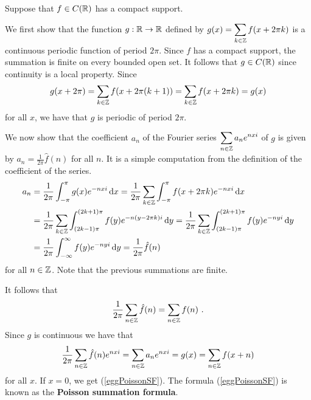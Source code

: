 \begin{egg}
Suppose that $f \in C(\mathbb{R})$ has a compact support.

We first show that the function $\displaystyle g:\mathbb{R} \to \mathbb{R}$ defined by
$\displaystyle g(x) = \sum_{k\in \mathbb{Z}} f(x+ 2 \pi k)$ is a
continuous periodic function of period $2\pi$.  Since $f$ has a
compact support, the summation is finite on every bounded open set.
It follows that $g \in C(\mathbb{R})$ since continuity is a local property.
Since
\[
g(x+2\pi) = \sum_{k\in \mathbb{Z}} f(x+2\pi(k+1))
= \sum_{k\in \mathbb{Z}} f(x+2 \pi k) = g(x)
\]
for all $x$, we have that $g$ is periodic of period $2 \pi$.

We now show that the coefficient $a_n$ of the Fourier series
$\displaystyle \sum_{n\in \mathbb{Z}} a_n e^{n x i}$ of $g$ is given by
$\displaystyle a_n = \frac{1}{2\pi} \hat{f}(n)$ for all $n$.  It is a simple
computation from the definition of the coefficient of the series.
\begin{align*}
a_n &= \frac{1}{2\pi} \int_{-\pi}^{\pi} g(x) e^{- n x i} \,\mathrm{d}{x}
= \frac{1}{2\pi}
\sum_{k\in \mathbb{Z}} \int_{-\pi}^{\pi} f(x+ 2 \pi k) e^{-n x i} \,\mathrm{d}{x} \\
&= \frac{1}{2\pi} 
\sum_{k\in \mathbb{Z}} \int_{(2k-1)\pi}^{(2k+1)\pi} f(y)
e^{-n (y-2 \pi k) i} \,\mathrm{d}{y}
= \frac{1}{2\pi} 
\sum_{k\in \mathbb{Z}} \int_{(2k-1)\pi}^{(2k+1)\pi} f(y) e^{-n y i} \,\mathrm{d}{y} \\
&= \frac{1}{2\pi} \int_{-\infty}^{\infty} f(y) e^{- n y i} \,\mathrm{d}{y}
= \frac{1}{2\pi} \hat{f}(n)
\end{align*}
for all $n \in \mathbb{Z}$.  Note that the previous summations are finite.

It follows that
\begin{equation} \label{eggPoissonSF}
  \frac{1}{2\pi} \sum_{n\in \ZZ} \hat{f}(n) = \sum_{n\in\ZZ} f(n) \ .
\end{equation}
Since $g$ is continuous we have that
\[
\frac{1}{2\pi} \sum_{n\in \mathbb{Z}} \hat{f}(n) e^{n x i}
= \sum_{n\in \mathbb{Z}} a_n e^{n x i} = g(x) =  \sum_{n\in\mathbb{Z}} f(x+n)
\]
for all $x$.  If $x = 0$, we get (\ref{eggPoissonSF}).  The formula 
(\ref{eggPoissonSF}) is known as the
{\bfseries Poisson summation formula}.
\end{egg}

